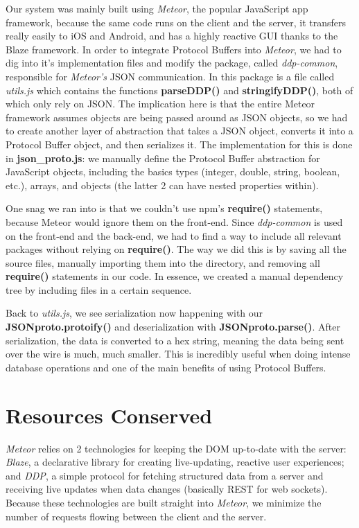 \documentclass[a4paper, 11pt]{article} %
\begin{document}
Our system was mainly built using \textit{Meteor}, the popular JavaScript app framework, because the same code runs on the client and the server, it transfers really easily to iOS and Android, and has a highly reactive GUI thanks to the Blaze framework. In order to integrate Protocol Buffers into \textit{Meteor}, we had to dig into it's implementation files and modify the package, called \textit{ddp-common}, responsible for \textit{Meteor's} JSON communication. In this package is a file called \textit{utils.js} which contains the functions \textbf{parseDDP()} and \textbf{stringifyDDP()}, both of which only rely on JSON. The implication here is that the entire Meteor framework assumes objects are being passed around as JSON objects, so we had to create another layer of abstraction that takes a JSON object, converts it into a Protocol Buffer object, and then serializes it. The implementation for this is done in \textbf{json\_proto.js}: we manually define the Protocol Buffer abstraction for JavaScript objects, including the basics types (integer, double, string, boolean, etc.), arrays, and objects (the latter 2 can have nested properties within). 

One snag we ran into is that we couldn't use npm's \textbf{require()} statements, because Meteor would ignore them on the front-end. Since \textit{ddp-common} is used on the front-end and the back-end, we had to find a way to include all relevant packages without relying on \textbf{require()}. The way we did this is by saving all the source files, manually importing them into the directory, and removing all \textbf{require()} statements in our code. In essence, we created a manual dependency tree by including files in a certain sequence. 

Back to \textit{utils.js}, we see serialization now happening with our \textbf{JSONproto.protoify()} and deserialization with \textbf{JSONproto.parse()}. After serialization, the data is converted to a hex string, meaning the data being sent over the wire is much, much smaller. This is incredibly useful when doing intense database operations and one of the main benefits of using Protocol Buffers.

\section*{Resources Conserved}

\textit{Meteor} relies on 2 technologies for keeping the DOM up-to-date with the server: \textit{Blaze}, a declarative library for creating live-updating, reactive user experiences; and \textit{DDP}, a simple protocol for fetching structured data from a server and receiving live updates when data changes (basically REST for web sockets). Because these technologies are built straight into \textit{Meteor}, we minimize the number of requests flowing between the client and the server.
\end{document}
